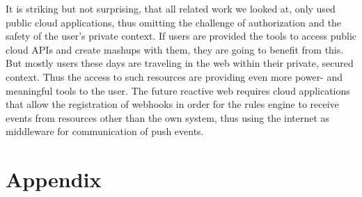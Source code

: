 \documentclass[11pt]{article}%
\begin{document}
It is striking but not surprising, that all related work we looked at, only used public cloud applications, thus omitting the challenge of authorization and the safety of the user's private context.
If users are provided the tools to access public cloud APIs and create mashups with them, they are going to benefit from this. But mostly users these days are traveling in the web within their private, secured context. Thus the access to such resources are providing even more power- and meaningful tools to the user. The future reactive web requires cloud applications that allow the registration of webhooks in order for the rules engine to receive events from resources other than the own system, thus using the internet as middleware for communication of push events.




\newpage
\appendix
\lstset { basicstyle=\tiny }

\section*{Appendix}
\end{document}
